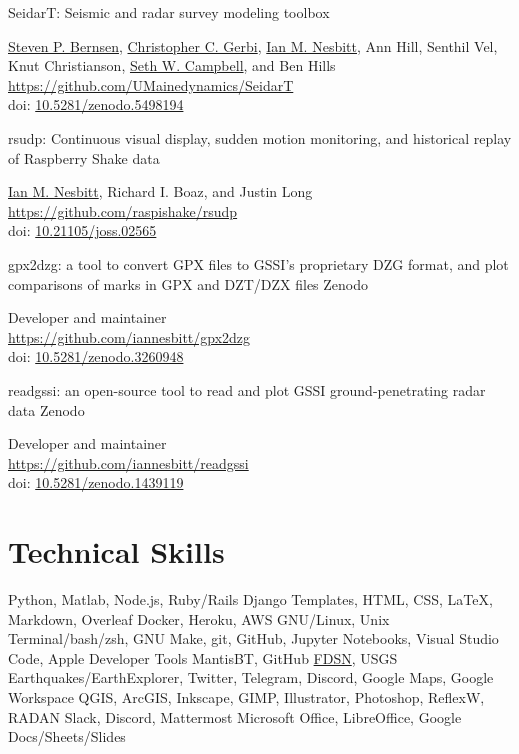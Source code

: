 \documentclass[a4paper,12pt,sans,colorlinks]{moderncv}
\newcommand{\me}{\href{https://www.iannesbitt.org}{Ian M. Nesbitt}}
\newcommand{\seth}{\href{https://www.alpinesciences.net}{Seth W. Campbell}}
\newcommand{\stevebernsen}{\href{https://watc.alaska.edu/node/73}{Steven P. Bernsen}}
\newcommand{\chris}{\href{https://umaine.edu/earthclimate/people/christopher-gerbi/}{Christopher C. Gerbi}}
\newcommand{\richard}{Richard I. Boaz}
\newcommand{\fdsn}{\href{https://www.fdsn.org/services/}{FDSN}}
\newcommand{\doi}[1]{%
    \href{https://doi.org/#1}{#1}
}
\begin{document}
{SeidarT: Seismic and radar survey modeling toolbox}
{}
{}
{}
{
    \stevebernsen{}, \chris{}, \me{}, Ann Hill, Senthil Vel,
    Knut Christianson, \seth{}, and Ben Hills
    \\
    \url{https://github.com/UMainedynamics/SeidarT}
    \\
    doi: \doi{10.5281/zenodo.5498194}
}

{rsudp: Continuous visual display, sudden motion monitoring,
and historical replay of Raspberry Shake data}
{}
{}
{}
{
    \me{}, \richard{}, and Justin Long
    \\
    \url{https://github.com/raspishake/rsudp}
    \\
    doi: \doi{10.21105/joss.02565}
}

{gpx2dzg: a tool to convert GPX files to GSSI's proprietary DZG
format, and plot comparisons of marks in GPX and DZT/DZX files}
{Zenodo}
{}
{}
{
    Developer and maintainer
    \\
    \url{https://github.com/iannesbitt/gpx2dzg}
    \\
    doi: \doi{10.5281/zenodo.3260948}
}

{readgssi: an open-source tool to read and plot GSSI
ground-penetrating radar data}
{Zenodo}
{}
{}
{
    Developer and maintainer
    \\
    \url{https://github.com/iannesbitt/readgssi}
    \\
    doi: \doi{10.5281/zenodo.1439119}
}





\section{Technical Skills}

{
    Python, Matlab, Node.js, Ruby/Rails
}
{
    Django Templates, HTML, CSS, \LaTeX, Markdown, Overleaf
}
{
    Docker, Heroku, AWS
}
{
    GNU/Linux, Unix Terminal/bash/zsh, GNU Make, git, GitHub, Jupyter
    Notebooks, Visual Studio Code, Apple Developer Tools
}
{
    MantisBT, GitHub
}
{
    \fdsn, USGS Earthquakes/EarthExplorer, Twitter, Telegram, Discord, Google
    Maps, Google Workspace
}
{
    QGIS, ArcGIS, Inkscape, GIMP, Illustrator, Photoshop, ReflexW, RADAN
}
{
    Slack, Discord, Mattermost
}
{
    Microsoft Office, LibreOffice, Google Docs/Sheets/Slides
}
\end{document}
